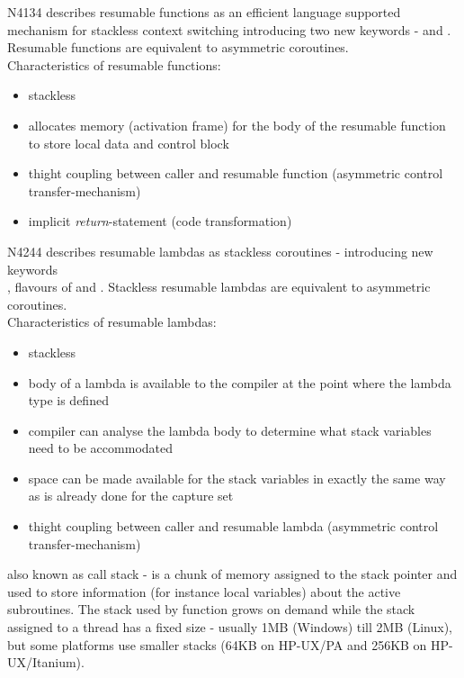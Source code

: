 N4134\cite{N4134} describes resumable functions as an efficient language
supported mechanism for stackless context switching introducing two new keywords
- \await and \yield. Resumable functions are equivalent to asymmetric
coroutines.\\
Characteristics of resumable functions:
\begin{itemize}
    \item stackless
    \item allocates memory (activation frame) for the body of the resumable
          function to store local data and control block
    \item thight coupling between caller and resumable function (asymmetric
          control transfer-mechanism)
    \item implicit \textit{return}-statement\cite{N4134} (code transformation)
\end{itemize}

N4244\cite{N4244} describes resumable lambdas as stackless coroutines -
introducing new keywords\\
\resumable, flavours of \yield and \rlthis. Stackless resumable lambdas are
equivalent to asymmetric coroutines.\\
Characteristics of resumable lambdas:
\begin{itemize}
    \item stackless
    \item body of a lambda is available to the compiler at the point
          where the lambda type is defined
    \item compiler can analyse the lambda body to determine what stack
          variables need to be accommodated
    \item space can be made available for the stack variables in exactly the
          same way as is already done for the capture set
    \item thight coupling between caller and resumable lambda (asymmetric
          control transfer-mechanism)
\end{itemize}

also known as call stack - is a chunk of memory assigned to the stack pointer
and used to store information (for instance local variables) about the active
subroutines. The stack used by function \main grows on demand while the stack
assigned to a thread has a fixed size - usually 1MB (Windows) till 2MB (Linux),
but some platforms use smaller stacks (64KB on HP-UX/PA and 256KB on
HP-UX/Itanium).

